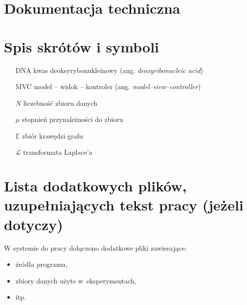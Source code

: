 \documentclass[a4paper,twoside,12pt]{book}
\newcommand{\obcy}[1]{\emph{#1}}
\newcommand{\ang}[1]{{\selectlanguage{british}\obcy{#1}}}
\begin{document}
\begin{appendices} 


\chapter*{Dokumentacja techniczna}

\chapter*{Spis skrótów i symboli}

\begin{itemize}
\item[DNA] kwas deoksyrybonukleinowy (ang. \ang{deoxyribonucleic acid})
\item[MVC] model -- widok -- kontroler (ang. \ang{model--view--controller}) 
\item[$N$] liczebność zbioru danych
\item[$\mu$] stopnień przynależności do zbioru
\item[$\mathbb{E}$] zbiór krawędzi grafu
\item[$\mathcal{L}$] transformata Laplace'a 
\end{itemize}


 

\chapter*{Lista dodatkowych plików, uzupełniających tekst pracy (jeżeli dotyczy)} 

W systemie do pracy dołączono dodatkowe pliki zawierające:
\begin{itemize}
\item źródła programu,
\item zbiory danych użyte w~eksperymentach,
\item itp.
\end{itemize}

\listoffigures
{}
\listoftables
{}
	
\end{appendices}
\end{document}
